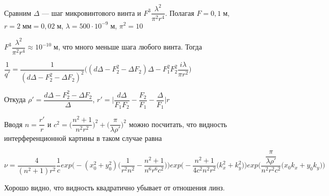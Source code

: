 Сравним $\Delta$ --- шаг микровинтового винта и $F^3 \dfrac{ \lambda^2}{\pi^2 r^4}$. Полагая $F = 0,1 \;м$, $r = 2 \; мм = 0,02 \; м$, $\lambda = 500 \cdot 10^{-9} \; м$, $\pi^2 = 10$



$F^3 \dfrac{ \lambda^2}{\pi^2 r^4} \approx 10^{-10} \; м $, что много меньше шага любого винта. Тогда



$\dfrac{1}{q'}= \dfrac{1}{(d\Delta - F_{2}^2 -\Delta F_{2})^2} \Big((d\Delta - F_{2}^2 - \Delta F_{2})\Delta - F^{2}_{1}F^{2}_{2}\dfrac{i \lambda}{\pi r^2}\Big)$



Откуда $\rho ' =  \dfrac{d\Delta - F_{2}^2 - \Delta F_{2}}{\Delta}$, $r' = \Big |\dfrac{d\Delta}{F_{1}F_{2}} - \dfrac{F_{2}}{F_{1}} - \dfrac{\Delta}{F_{1}}\Big|r$




Вводя $n = \dfrac{r'}{r}$ и $c^2 = \Big(\dfrac{n^2 + 1}{n^2r^2}\Big) ^2 + \Big(\dfrac{\pi}{\lambda \rho '}\Big) ^2$ можно посчитать, что видность интерференционной картины в таком случае равна 



$\nu = \dfrac{4}{(n^2 + 1)r^2} \dfrac{1}{c} exp\Big(- (x_{0}^2 + y_{0}^2 ) \Big(\dfrac{1}{r^2n^2} - \dfrac{n^2 + 1}{n^6 r^6 c^2}\Big)\Big)  exp\Big( -\dfrac{n^2 + 1}{4 c^2 n^2 r^2}(k_{x}^2 + k_{y}^2\Big) \Big)exp\Big(  \dfrac{\dfrac{\pi}{\lambda \rho'}}{n^2 r^2 c^2}(x_{0}k_{x} + y_{0}k_{y}\Big)\Big)$


Хорошо видно, что видность квадратично убывает от отношения линз.


%
